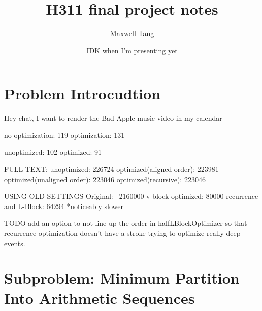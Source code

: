 \documentclass{article}
\title{H311 final project notes}
\author{Maxwell Tang}
\date{IDK when I'm presenting yet}
\begin{document}
\maketitle

\section*{Problem Introcudtion}
Hey chat, I want to render the Bad Apple music video in my calendar

no optimization: 119
optimization: 131

unoptimized: 102
optimized: 91

FULL TEXT:
unoptimized: 226724
optimized(aligned order): 223981
optimized(unaligned order): 223046
optimized(recursive): 223046

USING OLD SETTINGS
Original: ~2160000
v-block optimized: 80000
recurrence and L-Block: 64294
*noticeably slower

TODO add an option to not line up the order in halfLBlockOptimizer so that recurrence optimization doesn't have a stroke trying to optimize really deep events.

\section*{Subproblem: Minimum Partition Into Arithmetic Sequences}
\end{document}
